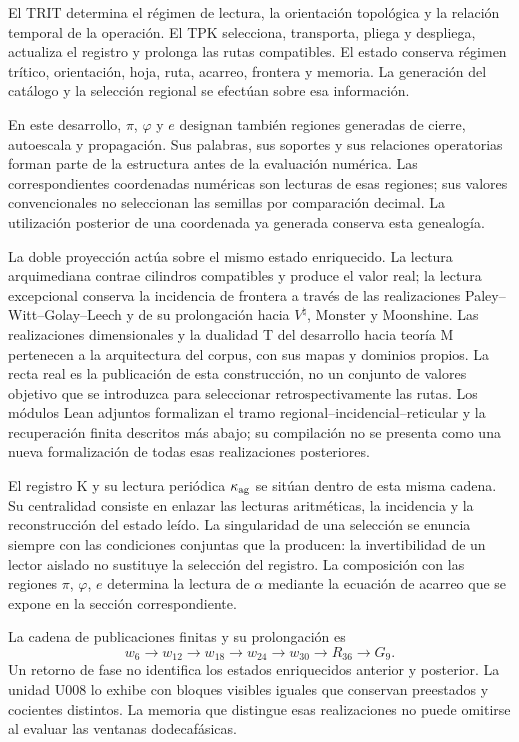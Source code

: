 \documentclass[11pt,a4paper]{article}
\begin{document}
El TRIT determina el régimen de lectura, la orientación topológica y la
relación temporal de la operación. El TPK selecciona, transporta,
pliega y despliega, actualiza el registro y prolonga las rutas compatibles.
El estado conserva régimen trítico, orientación, hoja, ruta, acarreo,
frontera y memoria. La generación del catálogo y la selección regional se
efectúan sobre esa información.

En este desarrollo, $\pi$, $\varphi$ y $e$ designan también regiones
generadas de cierre, autoescala y propagación. Sus palabras, sus soportes y
sus relaciones operatorias forman parte de la estructura antes de la
evaluación numérica. Las correspondientes coordenadas numéricas son
lecturas de esas regiones; sus valores convencionales no seleccionan las
semillas por comparación decimal. La utilización posterior de una
coordenada ya generada conserva esta genealogía.

La doble proyección actúa sobre el mismo estado enriquecido. La lectura
arquimediana contrae cilindros compatibles y produce el valor real; la
lectura excepcional conserva la incidencia de frontera a través de las
realizaciones Paley--Witt--Golay--Leech y de su prolongación hacia
$V^\natural$, Monster y Moonshine. Las realizaciones dimensionales y la
dualidad T del desarrollo hacia teoría M pertenecen a la arquitectura del
corpus, con sus mapas y dominios propios. La recta real es la publicación
de esta construcción, no un conjunto de valores objetivo que se introduzca
para seleccionar retrospectivamente las rutas. Los módulos Lean adjuntos
formalizan el tramo regional--incidencial--reticular y la recuperación
finita descritos más abajo; su compilación no se presenta como una nueva
formalización de todas esas realizaciones posteriores.

El registro K y su lectura periódica $\kappa_{\rm ag}$ se sitúan dentro de
esta misma cadena. Su centralidad consiste en enlazar las lecturas
aritméticas, la incidencia y la reconstrucción del estado leído. La
singularidad de una selección se enuncia siempre con las condiciones
conjuntas que la producen: la invertibilidad de un lector aislado no
sustituye la selección del registro. La composición con las regiones
$\pi$, $\varphi$, $e$ determina la lectura de $\alpha$ mediante la ecuación
de acarreo que se expone en la sección correspondiente.

La cadena de publicaciones finitas y su prolongación es
\[
 w_6\longrightarrow w_{12}\longrightarrow w_{18}
 \longrightarrow w_{24}\longrightarrow w_{30}
 \longrightarrow R_{36}\longrightarrow G_9.
\]
Un retorno de fase no identifica los estados enriquecidos anterior y
posterior. La unidad U008 lo exhibe con bloques visibles iguales que conservan
preestados y cocientes distintos. La memoria que distingue esas realizaciones
no puede omitirse al evaluar las ventanas dodecafásicas.
\end{document}

